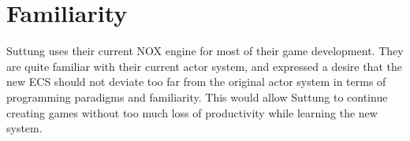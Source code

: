 \section{Familiarity}
Suttung uses their current NOX engine for most of their game development.
They are quite familiar with their current actor system, and expressed a desire that the new
ECS should not deviate too far from the original actor system in terms of programming paradigms
and familiarity.
This would allow Suttung to continue creating games without too much loss of productivity while
learning the new system.


